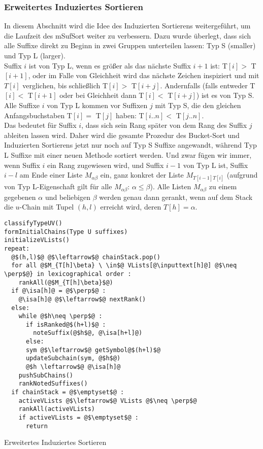 \subsubsection{Erweitertes Induziertes Sortieren} 
\label{4.3}

In diesem Abschnitt wird die Idee des Induzierten Sortierens weitergeführt, um die Laufzeit des mSufSort weiter zu verbessern.
Dazu wurde überlegt, dass sich alle Suffixe direkt zu Beginn in zwei Gruppen unterteilen lassen: Typ S (smaller) und Typ L (larger).\\
Suffix $i$ ist von Typ L, wenn es größer als das nächste Suffix $i+1$ ist: T$[i] >$ T$[i+1]$, oder im Falle von Gleichheit wird das nächste Zeichen inspiziert und mit $T[i]$ verglichen, bis schließlich T$[i] >$ T$[i+j]$. Andernfalls (falls entweder T$[i] <$ T$[i+1]$ oder bei Gleichheit dann T$[i] <$ T$[i+j]$) ist es von Typ S. Alle Suffixe $i$ von Typ L kommen vor Suffixen $j$ mit Typ S, die den gleichen Anfangsbuchstaben T$[i] =$ T$[j]$ haben: T$[i..n] <$ T$[j..n]$.
\\
Das bedeutet für Suffix $i$, dass sich sein Rang später von dem Rang des Suffix $j$ ableiten lassen wird. Daher wird die gesamte Prozedur des Bucket-Sort und Induzierten Sortierens jetzt nur noch auf Typ S Suffixe angewandt, während Typ L Suffixe mit einer neuen Methode sortiert werden.
Und zwar fügen wir immer, wenn Suffix $i$ ein Rang zugewiesen wird, und Suffix $i-1$ von Typ L ist, Suffix $i-l$ am Ende einer Liste $M_{\alpha\beta}$ ein, ganz konkret der  Liste $M_{T[i-1]T[i]}$ (aufgrund von Typ L-Eigenschaft gilt für alle $M_{\alpha\beta}$: $\alpha \leq \beta$). 
Alle Listen $M_{\alpha\beta}$ zu einem gegebenen $\alpha$ und beliebigen $\beta$ werden genau dann gerankt, wenn auf dem Stack die $u$-Chain mit Tupel $(h, l)$ erreicht wird, deren $T[h] = \alpha$.


\begin{listing}[htp]
\begin{verbatim}
classifyTypeUV()
formInitialChains(Type U suffixes)
initializeVLists()
repeat:
  @$(h,l)$@ @$\leftarrow$@ chainStack.pop()	
  for all @$M_{T[h]\beta} \ \in$@ VLists[@\inputtext[h]@] @$\neq \perp$@} in lexicographical order :
    rankAll(@$M_{T[h]\beta}$@)
  if @\isa[h]@ = @$\perp$@ :
    @\isa[h]@ @$\leftarrow$@ nextRank()		
  else:
    while @$h\neq \perp$@ :
      if isRanked@$(h+l)$@ :
        noteSuffix(@$h$@, @\isa[h+l]@)
      else:
      sym @$\leftarrow$@ getSymbol@$(h+l)$@
      updateSubchain(sym, @$h$@)
      @$h \leftarrow$@ @\isa[h]@
    pushSubChains()	
    rankNotedSuffixes()
  if chainStack = @$\emptyset$@ :
    activeVLists @$\leftarrow$@ VLists @$\neq \perp$@
    rankAll(activeVLists)
    if activeVLists = @$\emptyset$@ :
      return
\end{verbatim}
\caption{Erweitertes Induziertes Sortieren}
\label{erwIndSort}
\end{listing}

